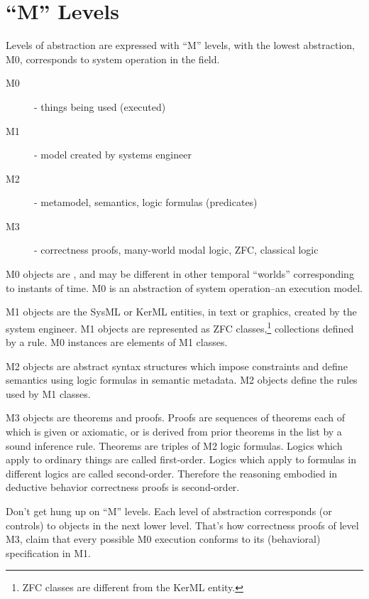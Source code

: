 \section{``M'' Levels}\label{sec:mlevels}

\pn Levels of abstraction are expressed with ``M'' levels, with the lowest abstraction, M0, corresponds to system operation in the field.


\begin{description}
\item[M0] - things being used (executed)
\item[M1] - model created by systems engineer
\item[M2] - metamodel, semantics, logic formulas (predicates)
\item[M3] - correctness proofs, many-world modal logic, ZFC, classical logic
\end{description}

\pn M0 objects are , and may be different in other temporal ``worlds'' corresponding to instants of time.  M0 is an abstraction of system operation--an execution model.%

\pn M1 objects are the SysML or KerML entities, in text or graphics, created by the system engineer.  M1 objects are represented as ZFC classes,\footnote{ZFC classes are different from the KerML entity.} collections defined by a rule.  M0 instances are elements of M1 classes.

\pn M2 objects are abstract syntax structures which impose constraints and define semantics using logic formulas in semantic metadata.
M2 objects define the rules used by M1 classes.

\pn M3 objects are theorems and proofs.  Proofs are sequences of theorems each of which is given or axiomatic, or is derived from prior theorems in the list by a sound inference rule.  Theorems are triples of M2 logic formulas.  Logics which apply to ordinary things are called first-order.  Logics which apply to formulas in different logics are called second-order.  Therefore the reasoning embodied in deductive behavior correctness proofs is second-order.

\pn Don't get hung up on ``M'' levels.  Each level of abstraction corresponds (or controls) to objects in the next lower level.
That's how correctness proofs of level M3, claim that every possible M0 execution conforms to its (behavioral) specification in M1.






